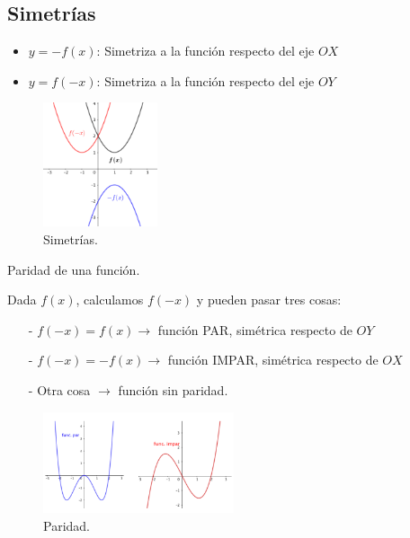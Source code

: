 		\subsection{Simetrí­as}
		
		\begin{itemize}
			\item $y=-f(x)$: Simetriza a la función respecto del eje $OX$
			\item $y=f(-x)$: Simetriza a la función respecto del eje $OY$
		\end{itemize}
		
		\begin{figure}[H]
			\centering
			\includegraphics[width=0.3\textwidth]{imagenes/imagenes02/T02IM09.png}
			\caption{Simetrí­as.}
		\end{figure}
		
			\begin{defi} Paridad de una función.
			
			 Dada $f(x)$, calculamos $f(-x)$ y pueden pasar tres cosas:	
			
			\begin{itemize}
				\item [-] $f(-x)=f(x) \to $ función PAR, simétrica respecto de $OY$
				\item [-] $f(-x)=-f(x) \to $ función IMPAR, simétrica respecto de $OX$
				\item [-] Otra cosa $\to$ función sin paridad.
			\end{itemize}
			\end{defi}
			
		\begin{figure}[H]
		\centering
		\includegraphics[width=0.5\textwidth]{imagenes/imagenes02/T02IM10.png}
		\caption{Paridad.}
		\end{figure}
		

